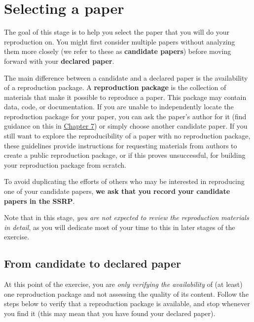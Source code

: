 \documentclass[
  openany]{book}
\begin{document}
\hypertarget{select}{%
\chapter{Selecting a paper}\label{select}}

The goal of this stage is to help you select the paper that you will do your reproduction on. You might first consider multiple papers without analyzing them more closely (we refer to these as \textbf{candidate papers}) before moving forward with your \textbf{declared paper}.

The main difference between a candidate and a declared paper is the availability of a reproduction package. A \textbf{reproduction package} is the collection of materials that make it possible to reproduce a paper. This package may contain data, code, or documentation. If you are unable to independently locate the reproduction package for your paper, you can ask the paper's author for it (find guidance on this in \href{https://bitss.github.io/ACRE/guidance-for-a-constructive-exchange-between-reproducers-and-original-authors.html}{Chapter 7}) or simply choose another candidate paper. If you still want to explore the reproducibility of a paper with no reproduction package, these guidelines provide instructions for requesting materials from authors to create a public reproduction package, or if this proves unsuccessful, for building your reproduction package from scratch.

To avoid duplicating the efforts of others who may be interested in reproducing one of your candidate papers, \textbf{we ask that you record your candidate papers in the SSRP}.

Note that in this stage, \emph{you are not expected to review the reproduction materials in detail}, as you will dedicate most of your time to this in later stages of the exercise.

\hypertarget{declare}{%
\section{From candidate to declared paper}\label{declare}}

At this point of the exercise, you are \emph{only verifying the availability} of (at least) one reproduction package and not assessing the quality of its content. Follow the steps below to verify that a reproduction package is available, and stop whenever you find it (this may mean that you have found your declared paper).
\end{document}
